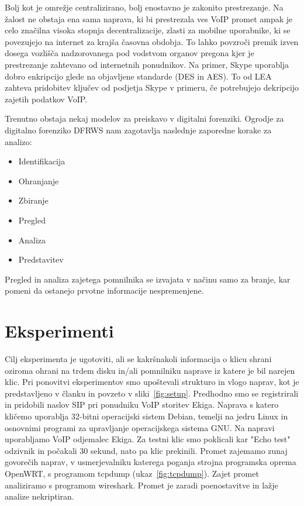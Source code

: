 \documentclass{acm_proc_article-sp}
\begin{document}
Bolj kot je omrežje centralizirano, bolj enostavno je zakonito prestrezanje. Na žalost ne obstaja ena sama naprava, ki bi prestrezala ves VoIP promet ampak je celo značilna visoka stopnja decentralizacije, zlasti za mobilne uporabnike, ki se povezujejo na internet za krajša časovna obdobja. To lahko povzroči premik izven dosega vozlišča nadzorovanega pod vodstvom organov pregona kjer je prestrezanje zahtevano od internetnih ponudnikov. Na primer, Skype uporablja dobro enkripcijo glede na objavljene standarde (DES in AES). To od LEA zahteva pridobitev ključev od podjetja Skype v primeru, če potrebujejo dekripcijo zajetih podatkov VoIP.

Trenutno obstaja nekaj modelov za preiskavo v digitalni forenziki. Ogrodje za digitalno forenziko DFRWS nam zagotavlja naslednje zaporedne korake za analizo:
\begin{itemize}
  \item Identifikacija
  \item Ohranjanje
  \item Zbiranje
  \item Pregled
  \item Analiza
  \item Predstavitev
\end{itemize}

Pregled in analiza zajetega pomnilnika se izvajata v načinu samo za branje, kar pomeni da ostanejo prvotne informacije nespremenjene.


\section{Eksperimenti}

Cilj eksperimenta je ugotoviti, ali se kakršnakoli informacija o klicu shrani oziroma ohrani na trdem disku in/ali pomnilniku naprave iz katere je bil narejen klic. Pri ponovitvi eksperimentov smo upoštevali strukturo in vlogo naprav, kot je predstavljeno v članku in povzeto v sliki~\ref{fig:setup}. Predhodno smo se registrirali in pridobili naslov SIP pri ponudniku VoIP storitev Ekiga. Naprava s katero kličemo uporablja 32-bitni operacijski sistem Debian, temelji na jedru Linux in osnovnimi programi za upravljanje operacijskega sistema GNU. Na napravi uporabljamo VoIP odjemalec Ekiga. Za testni klic smo poklicali kar "Echo test" odzivnik in počakali 30 sekund, nato pa klic prekinili. Promet zajemamo zunaj govorečih naprav, v usmerjevalniku katerega poganja strojna programska oprema OpenWRT, s programom tcpdump (ukaz~\ref{fig:tcpdump}). Zajet promet analiziramo s programom wireshark. Promet je zaradi poenostavitve in lažje analize nekriptiran.
\end{document}
